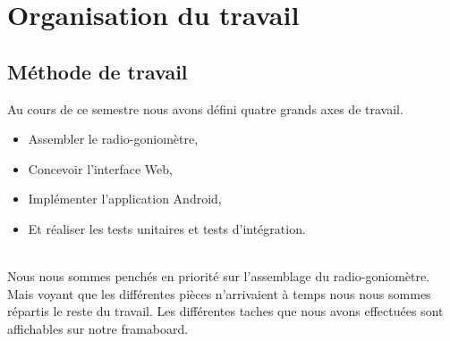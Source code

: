 
\chapter{Organisation du travail}


\section{Méthode de travail}

Au cours de ce semestre nous avons défini quatre grands axes de travail. 

\begin{itemize}
\item Assembler le radio-goniomètre,
\item Concevoir l'interface Web,
\item Implémenter l'application Android,
\item Et réaliser les tests unitaires et tests d'intégration.

\end{itemize}
~\\

Nous nous sommes penchés en priorité sur l'assemblage du radio-goniomètre. Mais voyant que les différentes pièces n'arrivaient à temps nous nous sommes répartis le reste du travail. Les différentes taches que nous avons effectuées sont affichables sur notre framaboard. 



